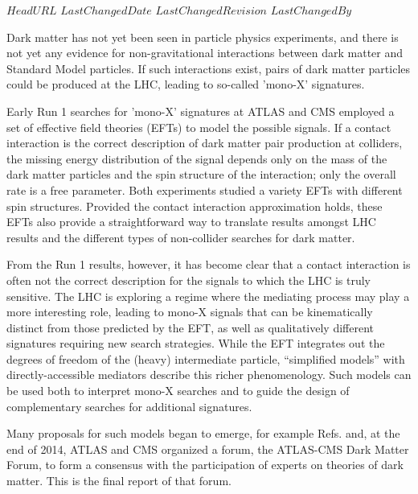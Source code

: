 \svnidlong
{$HeadURL$}
{$LastChangedDate$}
{$LastChangedRevision$}
{$LastChangedBy$}
\pagestyle{fancy}
\fancyhead{}
\fancyhead[ol]{\svnrev;\svndate;\svnauthor}

Dark matter has not yet been seen in particle physics experiments, and
there is not yet any evidence for non-gravitational interactions between dark
matter and Standard Model particles.  If such interactions exist,
pairs of dark matter particles could be produced at the LHC, leading
to so-called 'mono-X' signatures.

Early Run 1 searches for 'mono-X' signatures at ATLAS and CMS employed
a set of effective field theories (EFTs) \cite{Goodman:2010ku} to
model the possible signals. If a contact interaction is the correct
description of dark matter pair production at colliders, the missing
energy distribution of the signal depends only on the mass of the dark
matter particles and the spin structure of the interaction; only the
overall rate is a free parameter. Both experiments studied a variety
EFTs with different spin structures. Provided the contact interaction
approximation holds, these EFTs also provide a straightforward way to
translate results amongst LHC results and the different types of
non-collider searches for dark matter.

From the Run 1 results, however, it has become clear
\cite{Busoni:2013lha} that a contact interaction is often not the
correct description for the signals to which the LHC is truly
sensitive. The LHC is exploring a regime where the mediating process
may play a more interesting role, leading to mono-X signals that can
be kinematically distinct from those predicted by the EFT, as well as
qualitatively different signatures requiring new search
strategies. While the EFT integrates out the degrees of freedom of the
(heavy) intermediate particle, ``simplified models''
\cite{Alves:2011wf} with directly-accessible mediators describe this
richer phenomenology. Such models can be used both to interpret mono-X
searches and to guide the design of complementary searches for
additional signatures. 

Many proposals for such models began to emerge, for example
Refs. \cite{Tait:2013,Buchmueller:2013dya,Bai:2013iqa,Bai:2014osa,Yavin:14092893,Malik:2014ggr,Harris:2014hga,Buckley:2014fba}
and, at the end of 2014, ATLAS and CMS organized a forum, the
ATLAS-CMS Dark Matter Forum, to form a consensus with the
participation of experts on theories of dark matter. This is the final
report of that forum.

